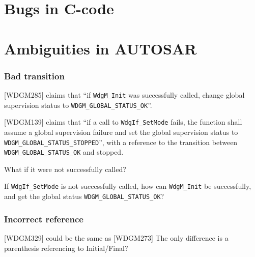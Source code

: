 \chapter{Bugs in C-code}


\chapter{Ambiguities in AUTOSAR}
\subsection*{Bad transition}
[WDGM285] claims that ``if \lstinline!WdgM_Init! was successfully called, change
global supervision status to \lstinline!WDGM_GLOBAL_STATUS_OK!''.

[WDGM139] claims that ``if a call to \lstinline!WdgIf_SetMode! fails,
the function shall assume a global supervision failure and set the
global supervision status to \lstinline!WDGM_GLOBAL_STATUS_STOPPED!'',
with a reference to the transition between
\lstinline!WDGM_GLOBAL_STATUS_OK! and stopped.

What if it were not successfully called?

If \lstinline!WdgIf_SetMode! is not successfully called, how can
\lstinline!WdgM_Init! be successfully, and get the global status
\lstinline!WDGM_GLOBAL_STATUS_OK!?


\subsection*{Incorrect reference}
[WDGM329] could be the same as [WDGM273]
The only difference is a parenthesis referencing to Initial/Final?

